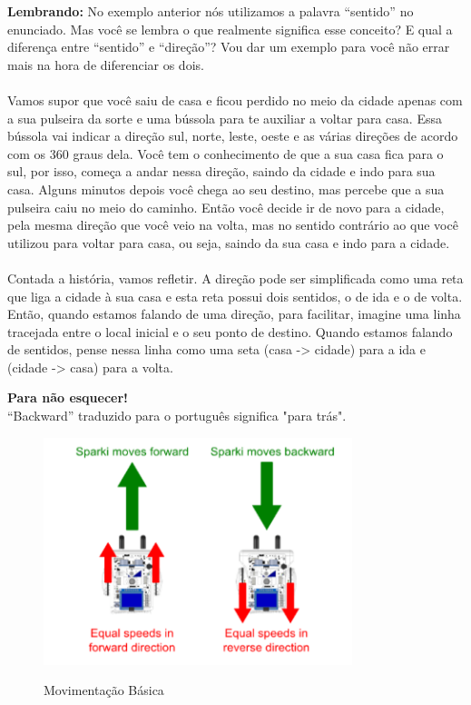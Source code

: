     \begin{center}
        \textcolor{mydarkblue!80!black}{\textbf{Lembrando:}} No exemplo anterior nós utilizamos a palavra ``sentido'' no enunciado. Mas você se lembra o que realmente significa esse conceito? E qual a diferença entre ``sentido'' e ``direção''? Vou dar um exemplo para você não errar mais na hora de diferenciar os dois.
    \end{center}
    
    \paragraph{}
    Vamos supor que você saiu de casa e ficou perdido no meio da cidade apenas com a sua pulseira da sorte e uma bússola para te auxiliar a voltar para casa. Essa bússola vai indicar a direção sul, norte, leste, oeste e as várias direções de acordo com os 360 graus dela. Você tem o conhecimento de que a sua casa fica para o sul, por isso, começa a andar nessa direção, saindo da cidade e indo para sua casa. Alguns minutos depois você chega ao seu destino, mas percebe que a sua pulseira caiu no meio do caminho. Então você decide ir de novo para a cidade, pela mesma direção que você veio na volta, mas no sentido contrário ao que você utilizou para voltar para casa, ou seja, saindo da sua casa e indo para a cidade. 
    \paragraph{}
    Contada a história, vamos refletir. A direção pode ser simplificada como uma reta que liga a cidade à sua casa e esta reta possui dois sentidos, o de ida e o de volta. Então, quando estamos falando de uma direção, para facilitar, imagine uma linha tracejada entre o local inicial e o seu ponto de destino. Quando estamos falando de sentidos, pense nessa linha como uma seta (casa -> cidade) para a ida e (cidade -> casa) para a volta.

    \begin{center}
    \textcolor{mydarkblue}{\textbf{Para não esquecer!}} \\ ``Backward'' traduzido para o português significa "para trás".
    \end{center}
    
    \begin{figure}[h]
    \caption{Movimentação Básica}
     
    \centering 
    \includegraphics[width=9cm]{Figuras/movimentation_for_back.png}
    \label{figura:movimentation_for_back.png}
    \end{figure}
    
